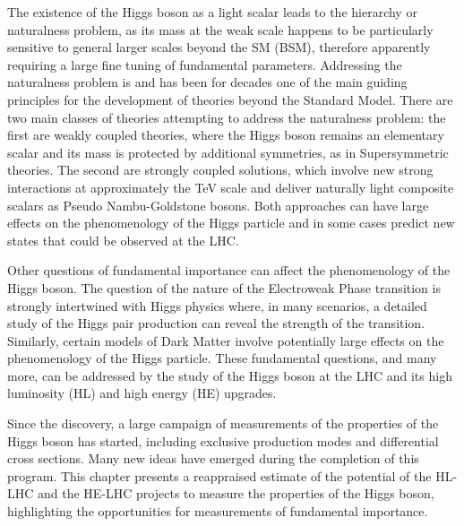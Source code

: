 \documentclass[../report.tex]{subfiles}
\begin{document}
The existence of the Higgs boson as a light scalar leads to the
hierarchy or naturalness problem, as its mass at the weak scale happens to be particularly sensitive to general larger scales beyond the SM (BSM), therefore apparently requiring a large fine tuning of fundamental parameters.
Addressing the naturalness problem is and has been for decades one of
the main guiding principles for the development of theories beyond the
Standard Model. 
There are two main classes of theories attempting
to address the naturalness problem: the first are weakly coupled theories, 
where the Higgs boson
remains an elementary scalar and its mass is protected by additional
symmetries, as in Supersymmetric theories. 
The second are strongly
coupled solutions, which involve new strong interactions at approximately the TeV scale and deliver naturally light composite scalars as Pseudo Nambu-Goldstone bosons. Both approaches can have large effects on the phenomenology
of the Higgs particle and in some cases predict new states that could be 
observed at the LHC.

Other questions of fundamental importance can affect the phenomenology
of the Higgs boson.  The question of the nature of the Electroweak Phase transition is strongly intertwined with Higgs physics where, in many scenarios, a detailed study of the Higgs pair production can reveal the strength of the transition.
Similarly, certain models of Dark Matter involve
potentially large effects on the phenomenology of the Higgs
particle.
These fundamental questions, and many more, can be addressed by the study of the
Higgs boson at the LHC and its high luminosity (HL) and high energy
(HE) upgrades.



Since the discovery, a large campaign of measurements of the properties of the
Higgs boson has started, including exclusive production modes and
differential cross sections. Many new ideas have emerged during the
completion of this program. This chapter presents a reappraised
estimate of the potential of the HL-LHC and the HE-LHC projects to
measure the properties of the Higgs boson, highlighting the
opportunities for measurements of fundamental importance.
\end{document}
